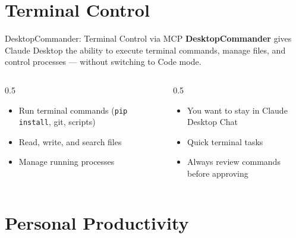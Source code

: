 \documentclass[aspectratio=169]{beamer}
\begin{document}
\section{Terminal Control}

\begin{frame}{DesktopCommander: Terminal Control via MCP}
\textbf{DesktopCommander} gives Claude Desktop the ability to execute terminal commands, manage files, and control processes --- without switching to Code mode.
\vspace{0.3cm}
\begin{columns}[T]
\begin{column}{0.5\textwidth}
\begin{shadedbox}[title=\textbf{What It Can Do}]
\begin{itemize}\small
  \item Run terminal commands (\texttt{pip install}, git, scripts)
  \item Read, write, and search files
  \item Manage running processes
\end{itemize}
\end{shadedbox}
\end{column}
\begin{column}{0.5\textwidth}
\begin{shadedbox}[title=\textbf{When to Use It}]
\begin{itemize}\small
  \item You want to stay in Claude Desktop Chat
  \item Quick terminal tasks
  \item \alert{Always review commands before approving}
\end{itemize}
\end{shadedbox}
\end{column}
\end{columns}
\end{frame}

\section{Personal Productivity}
\end{document}
